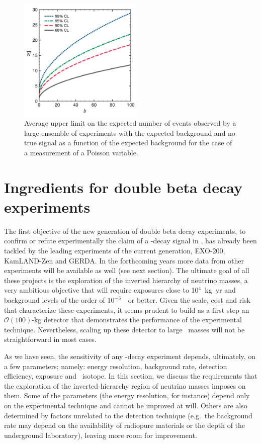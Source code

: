 \documentclass{PoS}
\begin{document}
\begin{figure}
\centering
\includegraphics[width=0.525\textwidth]{img/FCAverageUpperLimit.pdf}
\caption{Average upper limit on the expected number of events observed by a large ensemble of experiments with the expected background and no true signal as a function of the expected background for the case of a measurement of a Poisson variable.} \label{fig:FCAverageUpperLimit}
\end{figure}


\section{Ingredients for double beta decay experiments} 
The first objective of the new generation of double beta decay experiments, to confirm or refute experimentally the claim of a \bbonu-decay signal in \GE, has already been tackled by the leading experiments of the current generation,  EXO-200, KamLAND-Zen and GERDA. In the forthcoming years  more data from other experiments will be available as well (see next section). The ultimate goal of all these projects is the exploration of the inverted hierarchy of neutrino masses, a very ambitious objective that will require exposures close to 10$^{4}$~kg~yr and background levels of the order of $10^{-3}$~\ckky\ or better. Given the scale, cost and risk that characterize these experiments, it seems prudent to build as a first step an $\mathcal{O}(100)$-kg detector that demonstrates the performance of the experimental technique. Nevertheless, scaling up these detector to large \bb\ masses will not be straightforward in most cases. 

As we have seen, the sensitivity of any \bbonu-decay experiment depends, ultimately, on a few parameters; namely: energy resolution, background rate, detection efficiency, exposure and \bb\ isotope. In this section, we discuss the requirements that the exploration of the inverted-hierarchy region of neutrino masses imposes on them. 
Some of the parameters (the energy resolution, for instance) depend only on the experimental technique and cannot be improved at will. Others are also determined by factors unrelated to the detection technique (e.g.\ the background rate may depend on the availability of radiopure materials or the depth of the underground laboratory), leaving more room for improvement.
\end{document}
